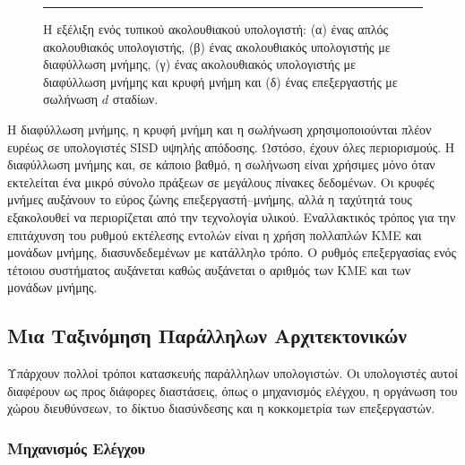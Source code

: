 \documentclass[12pt,a4paper]{article} %
\begin{document}
\begin{figure}[H]
\noindent\rule{\textwidth}{0.2pt}
\caption{Η εξέλιξη ενός τυπικού ακολουθιακού υπολογιστή:
(α) ένας απλός ακολουθιακός υπολογιστής, (β) ένας ακολουθιακός υπολογιστής με
διαφύλλωση μνήμης, (γ) ένας ακολουθιακός υπολογιστής με διαφύλλωση μνήμης και
κρυφή μνήμη και (δ) ένας επεξεργαστής με σωλήνωση $d$ σταδίων.}
\label{fig:graph28}
\end{figure}
\vspace{0.3cm}

Η διαφύλλωση μνήμης, η κρυφή μνήμη και η
σωλήνωση χρησιμοποιούνται πλέον ευρέως σε υπολογιστές SISD υψηλής
απόδοσης. Ωστόσο, έχουν όλες περιορισμούς. Η διαφύλλωση μνήμης και, σε κάποιο
βαθμό, η σωλήνωση είναι χρήσιμες μόνο όταν εκτελείται ένα μικρό σύνολο πράξεων σε
μεγάλους πίνακες δεδομένων. Οι κρυφές μνήμες αυξάνουν το εύρος ζώνης
επεξεργαστή--μνήμης, αλλά η ταχύτητά τους εξακολουθεί να περιορίζεται από την
τεχνολογία υλικού. Εναλλακτικός τρόπος για την επιτάχυνση του ρυθμού εκτέλεσης
εντολών είναι η χρήση πολλαπλών ΚΜΕ και μονάδων μνήμης, διασυνδεδεμένων με
κατάλληλο τρόπο. Ο ρυθμός επεξεργασίας ενός τέτοιου συστήματος αυξάνεται καθώς
αυξάνεται ο αριθμός των ΚΜΕ και των μονάδων μνήμης.

\subsection{Μια Ταξινόμηση Παράλληλων Αρχιτεκτονικών}

Υπάρχουν πολλοί τρόποι κατασκευής παράλληλων υπολογιστών. Οι υπολογιστές αυτοί
διαφέρουν ως προς διάφορες διαστάσεις, όπως ο μηχανισμός ελέγχου, η οργάνωση του
χώρου διευθύνσεων, το δίκτυο διασύνδεσης και η κοκκομετρία των επεξεργαστών.

\subsubsection{Μηχανισμός Ελέγχου}
\end{document}
